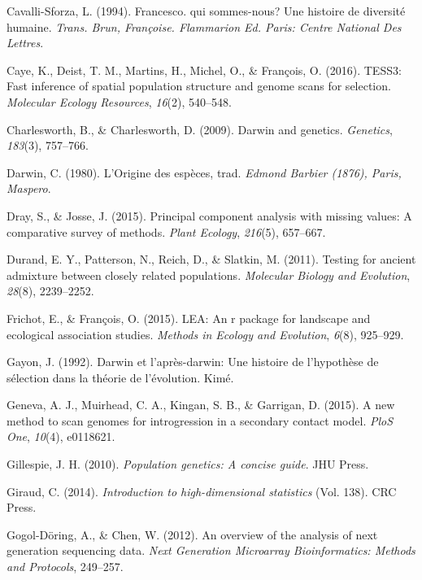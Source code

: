 \documentclass[12pt,twoside]{ugathesis}
\begin{document}
\hypertarget{ref-cavalli1994francesco}{}
Cavalli-Sforza, L. (1994). Francesco. qui sommes-nous? Une histoire de
diversité humaine. \emph{Trans. Brun, Françoise. Flammarion Ed. Paris:
Centre National Des Lettres}.

\hypertarget{ref-caye2016tess3}{}
Caye, K., Deist, T. M., Martins, H., Michel, O., \& François, O. (2016).
TESS3: Fast inference of spatial population structure and genome scans
for selection. \emph{Molecular Ecology Resources}, \emph{16}(2),
540--548.

\hypertarget{ref-charlesworth2009darwin}{}
Charlesworth, B., \& Charlesworth, D. (2009). Darwin and genetics.
\emph{Genetics}, \emph{183}(3), 757--766.

\hypertarget{ref-darwin1980origine}{}
Darwin, C. (1980). L'Origine des espèces, trad. \emph{Edmond Barbier
(1876), Paris, Maspero}.

\hypertarget{ref-dray2015principal}{}
Dray, S., \& Josse, J. (2015). Principal component analysis with missing
values: A comparative survey of methods. \emph{Plant Ecology},
\emph{216}(5), 657--667.

\hypertarget{ref-durand2011testing}{}
Durand, E. Y., Patterson, N., Reich, D., \& Slatkin, M. (2011). Testing
for ancient admixture between closely related populations.
\emph{Molecular Biology and Evolution}, \emph{28}(8), 2239--2252.

\hypertarget{ref-frichot2015lea}{}
Frichot, E., \& François, O. (2015). LEA: An r package for landscape and
ecological association studies. \emph{Methods in Ecology and Evolution},
\emph{6}(8), 925--929.

\hypertarget{ref-gayon1992darwin}{}
Gayon, J. (1992). Darwin et l'après-darwin: Une histoire de l'hypothèse
de sélection dans la théorie de l'évolution. Kimé.

\hypertarget{ref-geneva2015new}{}
Geneva, A. J., Muirhead, C. A., Kingan, S. B., \& Garrigan, D. (2015). A
new method to scan genomes for introgression in a secondary contact
model. \emph{PloS One}, \emph{10}(4), e0118621.

\hypertarget{ref-gillespie2010population}{}
Gillespie, J. H. (2010). \emph{Population genetics: A concise guide}.
JHU Press.

\hypertarget{ref-giraud2014introduction}{}
Giraud, C. (2014). \emph{Introduction to high-dimensional statistics}
(Vol. 138). CRC Press.

\hypertarget{ref-gogol2012overview}{}
Gogol-Döring, A., \& Chen, W. (2012). An overview of the analysis of
next generation sequencing data. \emph{Next Generation Microarray
Bioinformatics: Methods and Protocols}, 249--257.
\end{document}
